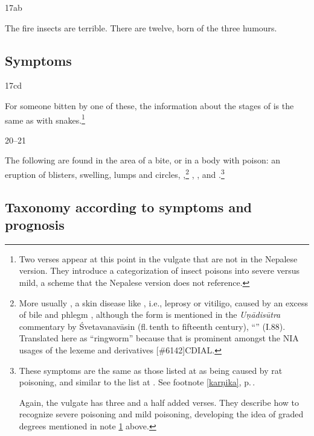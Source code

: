 \begin{translation}
\item[17ab]

The fire insects are terrible.  There are twelve, born of the three
humours.

\subsection{Symptoms}

\item[17cd] 

For someone bitten by one of these, the information about the stages
of  is the same as with snakes.\footnote{Two
    verses appear at this point in the vulgate that are not in the
    Nepalese version.  They introduce a categorization of insect poisons
    into severe versus mild, a scheme that the Nepalese version does not
    reference.\label{gradation}}

\item[20--21] 

The following are found in the area of a bite, or in a body
 with poison: an eruption of blisters, swelling,
lumps and circles, ,\footnote{More usually
    , a skin disease like , i.e., leprosy or
    vitiligo, caused by an excess of bile and phlegm
    \citep[390]{josi-maha}, although the form  is mentioned in
    the \emph{Uṇādisūtra} commentary by Śvetavanavāsin (fl.\,tenth to
    fifteenth century), “” (I.88). Translated
    here as “ringworm” because that is prominent amongst the NIA usages of
    the lexeme and derivatives
    [\#6142]{CDIAL}.} %
, ,
and .\footnote{These symptoms
    are the same as those listed at  as being caused by rat
    poisoning, and similar to the list at .  See footnote
    \ref{karṇika}, p.\,\pageref{karṇika}.
    
    Again, the vulgate has three and a half added verses.  They describe how to 
    recognize severe poisoning and mild poisoning, developing the idea of graded 
    degrees mentioned in note \ref{gradation} above.}

\subsection{Taxonomy according to symptoms and prognosis}


\end{translation}
